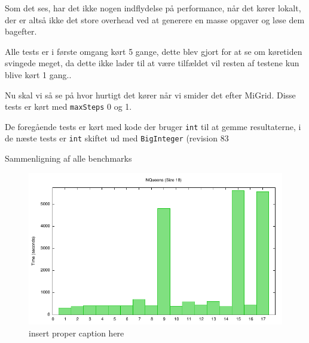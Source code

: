 Som det ses, har det ikke nogen indflydelse på performance, når det kører
lokalt, der er altså ikke det store overhead ved at generere en masse opgaver og
løse dem bagefter. 


Alle tests er i første omgang kørt 5 gange, dette blev gjort for at se om
køretiden svingede meget, da dette ikke lader til at være tilfældet vil resten
af testene kun blive kørt 1 gang.. 


Nu skal vi så se på hvor hurtigt det kører når vi smider det efter MiGrid. 
Disse tests er kørt med \texttt{maxSteps} 0 og 1. 


De foregående tests er kørt med kode der bruger \texttt{int} til at gemme resultaterne,
i de næste tests er \texttt{int} skiftet ud med \texttt{BigInteger} (revision
83

Sammenligning af alle benchmarks

\begin{figure}
\begin{center}
\includegraphics{../benchmarks/b3.pdf}
\caption{insert proper caption here } 
\label{plot:b3}
\end{center}
\end{figure}

